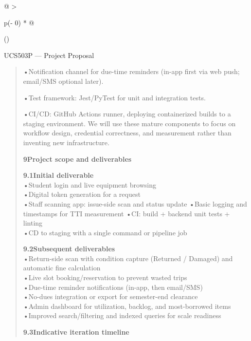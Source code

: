 \documentclass[
]{article}
\begin{document}
\begin{longtable}[]{@{}
  >{\raggedright\arraybackslash}p{(\columnwidth - 0\tabcolsep) * }@{}}
\toprule()
\begin{minipage}[b]{\linewidth}\raggedright
UCS503P --- Project Proposal

\begin{quote}
•Notification channel for due-time reminders (in-app first via web push;
email/SMS optional later).

•Test framework: Jest/PyTest for unit and integration tests.

•CI/CD: GitHub Actions runner, deploying containerized builds to a
staging environment. We will use these mature components to focus on
workflow design, credential correctness, and measurement rather than
inventing new infrastructure.

\textbf{9Project scope and deliverables}

\textbf{9.1Initial deliverable}\\
•Student login and live equipment browsing\\
•Digital token generation for a request\\
•Staff scanning app: issue-side scan and status update •Basic logging
and timestamps for TTI measurement •CI: build + backend unit tests +
linting\\
•CD to staging with a single command or pipeline job

\textbf{9.2Subsequent deliverables}\\
•Return-side scan with condition capture (Returned / Damaged) and
automatic fine calculation\\
•Live slot booking/reservation to prevent wasted trips\\
•Due-time reminder notifications (in-app, then email/SMS)\\
•No-dues integration or export for semester-end clearance\\
•Admin dashboard for utilization, backlog, and most-borrowed items\\
•Improved search/filtering and indexed queries for scale readiness

\textbf{9.3Indicative iteration timeline}
\end{quote}


\end{minipage}
\end{longtable}
\end{document}

